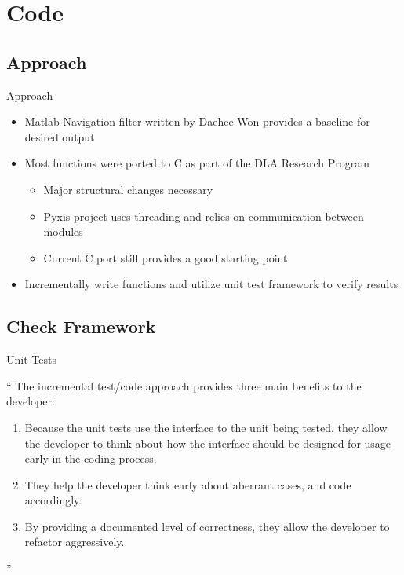 \documentclass[10pt, handout, aspectratio=169]{beamer}
\begin{document}
\section{Code}%

\subsection{Approach}
	\begin{frame}{Approach}
		\begin{itemize}
			\item Matlab Navigation filter written by Daehee Won provides a baseline for desired output
			\item Most functions were ported to C as part of the DLA Research Program
			\begin{itemize}
				\item Major structural changes necessary
				\item Pyxis project uses threading and relies on communication between modules
				\item Current C port still provides a good starting point
			\end{itemize}
			\item Incrementally write functions and utilize unit test framework to verify results
		\end{itemize}
	\end{frame}

\subsection{Check Framework}
	\begin{frame}{Unit Tests}
		\begin{block}{}
  		{{\Huge``} The incremental test/code approach provides three main benefits to the developer:
  			\begin{enumerate}
					\item Because the unit tests use the interface to the unit being tested, they allow the developer to think about how the interface should be designed for usage early in the coding process.
					\item They help the developer think early about aberrant cases, and code accordingly.
					\item By providing a documented level of correctness, they allow the developer to refactor aggressively.
				\end{enumerate} {\Huge''}}\cite{check:2016}
  		\vskip5mm
		\end{block}{}
	\end{frame}
\end{document}
